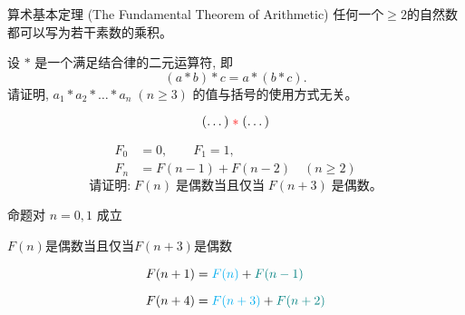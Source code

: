
\begin{frame}{}
  \begin{exampleblock}{算术基本定理 (The Fundamental Theorem of Arithmetic)}
    任何一个$\ge 2$的自然数都可以写为若干素数的乘积。
  \end{exampleblock}

  \pause
  \vspace{0.30cm}
  \begin{center}
  \end{center}
\end{frame}

\begin{frame}{}
  \begin{exampleblock}{}
    \begin{center}
      设 $\ast$ 是一个满足结合律的二元运算符, 即
      \[
        (a \ast b) \ast c = a \ast (b \ast c).
      \]
      请证明, $a_{1} \ast a_{2} \ast \dots \ast a_{n}\; (n \ge 3)$
      的值与括号的使用方式无关。
    \end{center}
  \end{exampleblock}

  \pause
  \vspace{0.30cm}
  \begin{center}
  \end{center}

  \pause
  \[
    (\dots) \;\textcolor{red}{\ast}\; (\dots)
  \]
\end{frame}

\begin{frame}{}
  \begin{exampleblock}{}
    \begin{align*}
      F_{0} &= 0, \qquad F_{1} = 1, \\[6pt]
      F_{n} &= F(n-1) + F(n-2) \quad (n \ge 2)
    \end{align*}
    \[
      \text{请证明:}\; F(n) \;\text{是偶数当且仅当}\; F(n+3) \;\text{是偶数。}
    \]
  \end{exampleblock}

  \pause
  \begin{center}

    \pause
    \vspace{0.30cm}
     命题对 $n = 0, 1$ 成立

    \pause
    \vspace{0.30cm}
     $F(n)$是偶数当且仅当$F(n+3)$是偶数

    \pause
    \begin{align*}
      F(n+1) &= \textcolor{cyan}{F(n)} + \textcolor{teal}{F(n-1)} \\[6pt]
      F(n+4) &= \textcolor{cyan}{F(n+3)} + \textcolor{teal}{F(n+2)}
    \end{align*}
  \end{center}
\end{frame}

